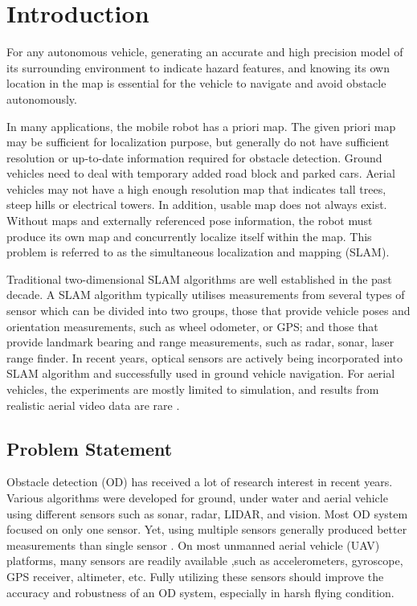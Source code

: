 \chapter{Introduction} \label{ch:intro}
For any autonomous vehicle, generating an accurate and high precision
model of its surrounding environment to indicate hazard features, and
knowing its own location in the map is essential for the vehicle to
navigate and avoid obstacle autonomously.

In many applications, the mobile robot has a priori map. The given
priori map may be sufficient for localization purpose, but generally
do not have sufficient resolution or up-to-date information required
for obstacle detection. Ground vehicles need to deal with temporary
added road block and parked cars. Aerial vehicles may not have a high
enough resolution map that indicates tall trees, steep hills or
electrical towers. In addition, usable map does not always exist.
Without maps and externally referenced pose information, the robot
must produce its own map and concurrently localize itself within the
map. This problem is referred to as the simultaneous localization and
mapping (SLAM).

Traditional two-dimensional SLAM algorithms are well established in
the past decade. A SLAM algorithm typically utilises measurements from
several types of sensor which can be divided into two groups, those
that provide vehicle poses and orientation measurements, such as wheel
odometer, or GPS; and those that provide landmark bearing and range
measurements, such as radar, sonar, laser range finder. In recent
years, optical sensors are actively being incorporated into SLAM
algorithm and successfully used in ground vehicle navigation. For
aerial vehicles, the experiments are mostly limited to simulation, and
results from realistic aerial video data are rare
\cite{nemra_robust_2010} \cite{jianli_unscented_2011}
\cite{sunderhauf_using_2007} \cite{artieda_visual_2009}.

\section{Problem Statement}\label{section:ProblemStatement}
Obstacle detection (OD) has received a lot of research interest in
recent years. Various algorithms were developed for ground, under
water and aerial vehicle using different sensors such as sonar, radar,
LIDAR, and vision. Most OD system focused on only one sensor. Yet,
using multiple sensors generally produced better measurements than
single sensor \cite{smith_approaches_2006}. On most unmanned aerial
vehicle (UAV) platforms, many sensors are readily available ,such as
accelerometers, gyroscope, GPS receiver, altimeter, etc. Fully
utilizing these sensors should improve the accuracy and robustness of
an OD system, especially in harsh flying condition.

